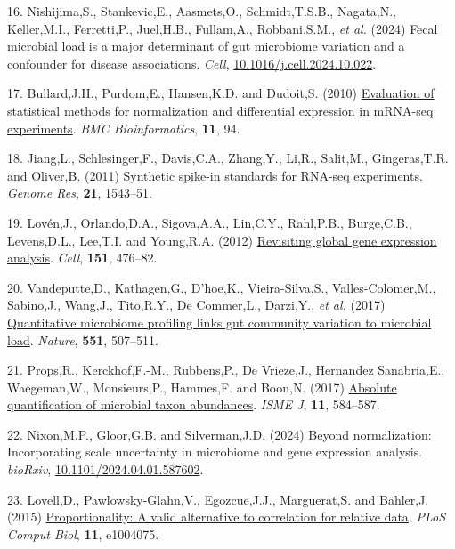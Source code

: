 \documentclass[
]{article}
\newlength{\cslhangindent}
\newenvironment{CSLReferences}[2] %
 {\begin{list}{}{%
  \setlength{\itemindent}{0pt}
  \setlength{\leftmargin}{0pt}
  \setlength{\parsep}{0pt}
  \ifodd #1
   \setlength{\leftmargin}{\cslhangindent}
   \setlength{\itemindent}{-1\cslhangindent}
  \fi
  \setlength{\itemsep}{#2\baselineskip}}}
 {\end{list}}
\begin{document}
\begin{CSLReferences}{1}{1}
16. Nishijima,S., Stankevic,E., Aasmets,O., Schmidt,T.S.B., Nagata,N.,
Keller,M.I., Ferretti,P., Juel,H.B., Fullam,A., Robbani,S.M., \emph{et
al.} (2024) Fecal microbial load is a major determinant of gut
microbiome variation and a confounder for disease associations.
\emph{Cell},
\href{https://doi.org/10.1016/j.cell.2024.10.022}{10.1016/j.cell.2024.10.022}.

17. Bullard,J.H., Purdom,E., Hansen,K.D. and Dudoit,S. (2010)
\href{https://doi.org/10.1186/1471-2105-11-94}{Evaluation of statistical
methods for normalization and differential expression in m{RNA-seq}
experiments}. \emph{BMC Bioinformatics}, \textbf{11}, 94.

18. Jiang,L., Schlesinger,F., Davis,C.A., Zhang,Y., Li,R., Salit,M.,
Gingeras,T.R. and Oliver,B. (2011)
\href{https://doi.org/10.1101/gr.121095.111}{Synthetic spike-in
standards for RNA-seq experiments}. \emph{Genome Res}, \textbf{21},
1543--51.

19. Lovén,J., Orlando,D.A., Sigova,A.A., Lin,C.Y., Rahl,P.B.,
Burge,C.B., Levens,D.L., Lee,T.I. and Young,R.A. (2012)
\href{https://doi.org/10.1016/j.cell.2012.10.012}{Revisiting global gene
expression analysis}. \emph{Cell}, \textbf{151}, 476--82.

20. Vandeputte,D., Kathagen,G., D'hoe,K., Vieira-Silva,S.,
Valles-Colomer,M., Sabino,J., Wang,J., Tito,R.Y., De Commer,L.,
Darzi,Y., \emph{et al.} (2017)
\href{https://doi.org/10.1038/nature24460}{Quantitative microbiome
profiling links gut community variation to microbial load}.
\emph{Nature}, \textbf{551}, 507--511.

21. Props,R., Kerckhof,F.-M., Rubbens,P., De Vrieze,J., Hernandez
Sanabria,E., Waegeman,W., Monsieurs,P., Hammes,F. and Boon,N. (2017)
\href{https://doi.org/10.1038/ismej.2016.117}{Absolute quantification of
microbial taxon abundances}. \emph{ISME J}, \textbf{11}, 584--587.

22. Nixon,M.P., Gloor,G.B. and Silverman,J.D. (2024) Beyond
normalization: Incorporating scale uncertainty in microbiome and gene
expression analysis. \emph{bioRxiv},
\href{https://doi.org/10.1101/2024.04.01.587602}{10.1101/2024.04.01.587602}.

23. Lovell,D., Pawlowsky-Glahn,V., Egozcue,J.J., Marguerat,S. and
Bähler,J. (2015)
\href{https://doi.org/10.1371/journal.pcbi.1004075}{Proportionality: A
valid alternative to correlation for relative data}. \emph{PLoS Comput
Biol}, \textbf{11}, e1004075.


\end{CSLReferences}
\end{document}
